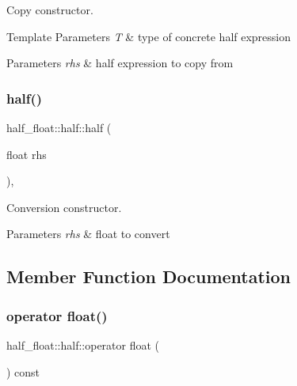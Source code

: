 Copy constructor. 
\begin{DoxyTemplParams}{Template Parameters}
{\em T} & type of concrete half expression \\
\hline
\end{DoxyTemplParams}

\begin{DoxyParams}{Parameters}
{\em rhs} & half expression to copy from \\
\hline
\end{DoxyParams}
\mbox{\label{classhalf__float_1_1half_aad7fddc333853c6a37016e2eac3d4d04}} 
\subsubsection{\texorpdfstring{half()}{half()}\hspace{0.1cm}{\footnotesize\ttfamily [3/3]}}
{\footnotesize\ttfamily half\+\_\+float\+::half\+::half (\begin{DoxyParamCaption}\item[{float}]{rhs }\end{DoxyParamCaption})\hspace{0.3cm}{\ttfamily [inline]}, {\ttfamily [explicit]}}

Conversion constructor. 
\begin{DoxyParams}{Parameters}
{\em rhs} & float to convert \\
\hline
\end{DoxyParams}


\subsection{Member Function Documentation}
\mbox{\label{classhalf__float_1_1half_ac44a6dc499322ae9330375f2b0dda8b6}} 
\subsubsection{\texorpdfstring{operator float()}{operator float()}}
{\footnotesize\ttfamily half\+\_\+float\+::half\+::operator float (\begin{DoxyParamCaption}{ }\end{DoxyParamCaption}) const\hspace{0.3cm}{\ttfamily [inline]}}

